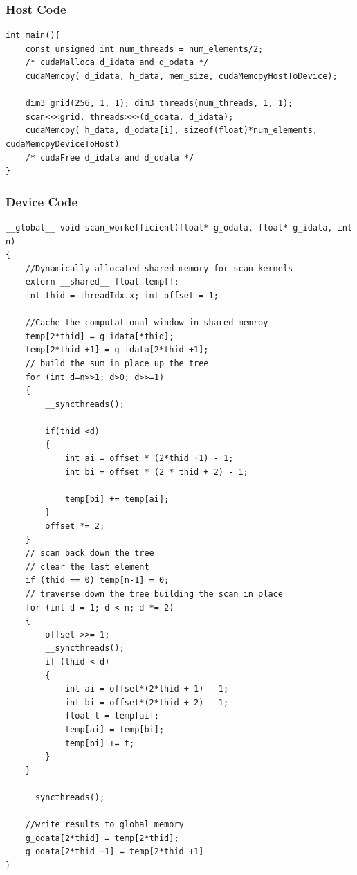 \documentclass[12pt]{book}
\begin{document}
\subsubsection*{Host Code}
\begin{lstlisting}[style=cppstyle]
int main(){
    const unsigned int num_threads = num_elements/2;
    /* cudaMalloca d_idata and d_odata */
    cudaMemcpy( d_idata, h_data, mem_size, cudaMemcpyHostToDevice);

    dim3 grid(256, 1, 1); dim3 threads(num_threads, 1, 1);
    scan<<<grid, threads>>>(d_odata, d_idata);
    cudaMemcpy( h_data, d_odata[i], sizeof(float)*num_elements, cudaMemcpyDeviceToHost)
    /* cudaFree d_idata and d_odata */
}
\end{lstlisting}
\subsubsection*{Device Code}
\begin{lstlisting}[style=cppstyle]
__global__ void scan_workefficient(float* g_odata, float* g_idata, int n)
{
    //Dynamically allocated shared memory for scan kernels
    extern __shared__ float temp[];
    int thid = threadIdx.x; int offset = 1;

    //Cache the computational window in shared memroy
    temp[2*thid] = g_idata[*thid];
    temp[2*thid +1] = g_idata[2*thid +1];
    // build the sum in place up the tree
    for (int d=n>>1; d>0; d>>=1)
    {
        __syncthreads();
    
        if(thid <d)
        {
            int ai = offset * (2*thid +1) - 1;
            int bi = offset * (2 * thid + 2) - 1;

            temp[bi] += temp[ai];
        }
        offset *= 2;
    }
    // scan back down the tree
    // clear the last element
    if (thid == 0) temp[n-1] = 0;
    // traverse down the tree building the scan in place
    for (int d = 1; d < n; d *= 2)
    {
        offset >>= 1;
        __syncthreads();
        if (thid < d)
        {
            int ai = offset*(2*thid + 1) - 1;
            int bi = offset*(2*thid + 2) - 1;
            float t = temp[ai];
            temp[ai] = temp[bi];
            temp[bi] += t;
        }
    }

    __syncthreads();

    //write results to global memory
    g_odata[2*thid] = temp[2*thid];
    g_odata[2*thid +1] = temp[2*thid +1]
}
\end{lstlisting}
\end{document}
